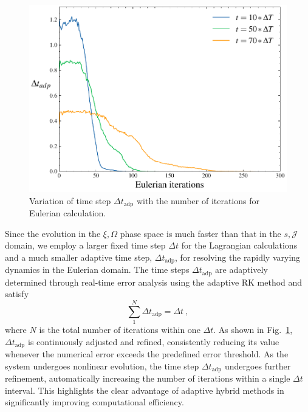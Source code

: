\begin{figure}[htbp]
    \centering
    \includegraphics[scale=0.5]{cpc_img/fig_dts1.pdf}
    \caption{Variation of time step $\Delta t_\mathrm{adp}$ with the number of iterations for Eulerian calculation.  
    }
    \label{fig.adapetive}
\end{figure}
Since the evolution in the $\xi,\Omega$  phase space 
is much 
faster 
than that in the $s,\mathcal{J}$ domain, we employ a larger fixed time step $\Delta t$ for the Lagrangian calculations 
and a much smaller adaptive time step, $\Delta t_\mathrm{adp}$, for resolving the rapidly varying dynamics in the Eulerian domain. The time steps $\Delta t_\mathrm{adp}$ are adaptively determined through real-time error analysis using the adaptive RK method and satisfy
\begin{equation}
    \sum_{1}^N \Delta t_\mathrm{adp} = \Delta t ~,
\end{equation}
where $N$ is the total number of iterations within one $\Delta t$. 
As shown in Fig.~\ref{fig.adapetive}, 
$\Delta t_\mathrm{adp}$ is continuously adjusted and refined, consistently reducing its value whenever the numerical error exceeds the predefined error threshold. As the system undergoes nonlinear evolution, the time step $\Delta t_\mathrm{adp}$ undergoes further refinement, automatically increasing the number of iterations within a single $\Delta t$ interval. This highlights the clear advantage of adaptive hybrid methods in significantly improving computational efficiency.



